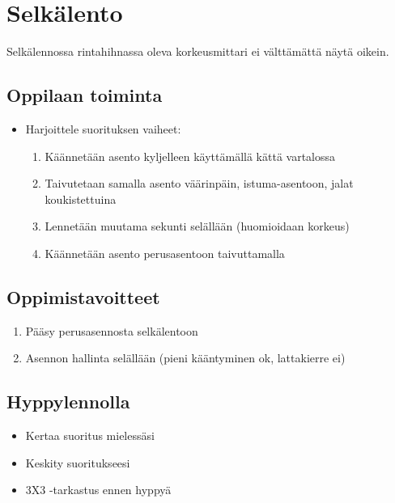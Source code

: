 \section{ Selkälento }
\label{peruskoulutuksen-muut-suoritukset-selkalento}


Selkälennossa rintahihnassa oleva korkeusmittari ei välttämättä näytä oikein. 

\subsection{ Oppilaan toiminta }
\label{peruskoulutuksen-muut-suoritukset-oppilaan-toiminta}

\begin{itemize}
\item Harjoittele suorituksen vaiheet: 
	\begin{enumerate}[label=\bfseries \arabic*)]
	\item  Käännetään asento kyljelleen käyttämällä kättä vartalossa 
	\item  Taivutetaan samalla asento väärinpäin, istuma-asentoon, jalat koukistettuina 
	\item  Lennetään muutama sekunti selällään (huomioidaan korkeus) 
	\item  Käännetään asento perusasentoon taivuttamalla 
	\end{enumerate}
\end{itemize}
\subsection{ Oppimistavoitteet }
\label{peruskoulutuksen-muut-suoritukset-oppimistavoitteet}

\begin{enumerate}[label=\bfseries \arabic*)]
\item  Pääsy perusasennosta selkälentoon 
\item  Asennon hallinta selällään (pieni kääntyminen ok, lattakierre ei) 
\end{enumerate}
\subsection{ Hyppylennolla }
\label{peruskoulutuksen-muut-suoritukset-hyppylennolla}

\begin{itemize}
\item Kertaa suoritus mielessäsi 
\item Keskity suoritukseesi 
\item 3X3 -tarkastus ennen hyppyä 
\end{itemize}
